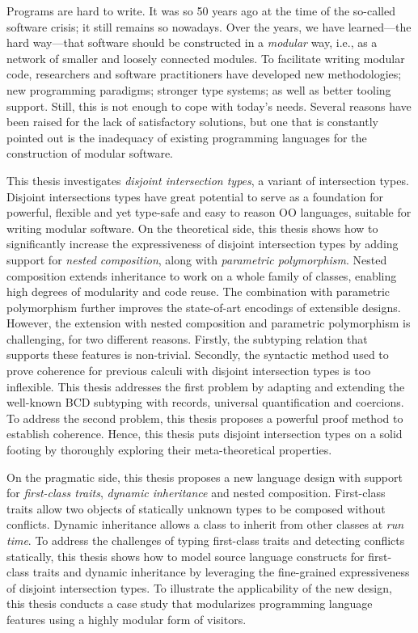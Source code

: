 
Programs are hard to write. It was so 50 years ago at the time of the so-called
software crisis; it still remains so nowadays. Over the years, we have
learned---the hard way---that software should be constructed in a
\textit{modular} way, i.e., as a network of smaller and loosely connected
modules. To facilitate writing modular code, researchers and software
practitioners have developed new methodologies; new programming paradigms;
stronger type systems; as well as better tooling support. Still, this is not
enough to cope with today's needs. Several reasons have been raised for the lack
of satisfactory solutions, but one that is constantly pointed out is the
inadequacy of existing programming languages for the construction of
modular software.

This thesis investigates \textit{disjoint intersection types}, a variant of
intersection types. Disjoint intersections types have great potential to serve
as a foundation for powerful, flexible and yet type-safe and easy to reason OO
languages, suitable for writing modular software. On the theoretical side, this
thesis shows how to significantly increase the expressiveness of disjoint
intersection types by adding support for \textit{nested composition}, along with
\textit{parametric polymorphism}. Nested composition extends inheritance to work
on a whole family of classes, enabling high degrees of modularity and code
reuse. The combination with parametric polymorphism further improves the
state-of-art encodings of extensible designs. However, the extension with nested
composition and parametric polymorphism is challenging, for two different
reasons. Firstly, the subtyping relation that supports these features is
non-trivial. Secondly, the syntactic method used to prove coherence for previous
calculi with disjoint intersection types is too inflexible. This thesis
addresses the first problem by adapting and extending the well-known BCD
subtyping with records, universal quantification and coercions. To address the
second problem, this thesis proposes a powerful proof method to establish
coherence. Hence, this thesis puts disjoint intersection types on a solid
footing by thoroughly exploring their meta-theoretical properties.

On the pragmatic side, this thesis proposes a new language design with support
for \textit{first-class traits}, \textit{dynamic inheritance} and nested
composition. First-class traits allow two objects of statically unknown types
to be composed without conflicts. Dynamic inheritance allows a class to inherit
from other classes at \textit{run time}. To address the challenges of typing
first-class traits and detecting conflicts statically, this thesis shows how to
model source language constructs for first-class traits and dynamic inheritance
by leveraging the fine-grained expressiveness of disjoint intersection types. To
illustrate the applicability of the new design, this thesis conducts a case
study that modularizes programming language features using a highly modular form
of visitors.

